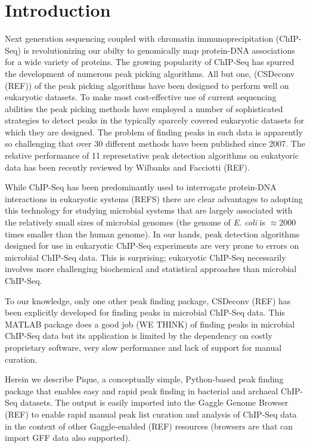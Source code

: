 \documentclass{bioinfo}
\begin{document}
\section{Introduction}

\noindent Next generation sequencing coupled with chromatin
immunoprecipitation (ChIP-Seq) is revolutionizing our abilty to
genomically map protein-DNA associations for a wide variety of
proteins.  The growing popularity of ChIP-Seq has spurred the
development of numerous peak picking algorithms.  All but one,
(CSDeconv (REF)) of the peak picking algorithms have been designed to
perform well on eukaryotic datasets.  To make most cost-effective use
of current sequencing abilities the peak picking methods have employed
a number of sophisticated strategies to detect peaks in the typically
sparcely covered eukaryotic datasets for which they are designed.  The
problem of finding peaks in such data is apparently so challenging
that over 30 different methods have been published since 2007.  The
relative performance of 11 represetative peak detection algorithms on
eukatyoric data has been recently reviewed by Wilbanks and Facciotti
(REF).

While ChIP-Seq has been predominantly used to interrogate protein-DNA
interactions in eukaryotic systems (REFS) there are clear advantages
to adopting this technology for studying microbial systems that are
largely associated with the relatively small sizes of microbial
genomes (the genome of {\em E. coli} is $\approx$2000 times smaller
than the human genome). In our hands, peak detection algorithms
designed for use in eukaryotic ChIP-Seq experiments are very prone to
errors on microbial ChIP-Seq data. This is surprising; eukaryotic
ChIP-Seq necessarily involves more challenging biochemical and
statistical approaches than microbial ChIP-Seq.

To our knowledge, only one other peak finding package, CSDeconv (REF)
has been explicitly developed for finding peaks in microbial ChIP-Seq
data. This MATLAB package does a good job (WE THINK) of finding peaks
in microbial ChIP-Seq data but its application is limited by the
dependency on costly proprietary software, very slow performance and
lack of support for manual curation.

Herein we describe Pique, a conceptually simple, Python-based peak
finding package that enables easy and rapid peak finding in bacterial
and archaeal ChIP-Seq datasets.  The output is easily imported into
the Gaggle Genome Browser (REF) to enable rapid manual peak list
curation and analysis of ChIP-Seq data in the context of other
Gaggle-enabled (REF) resources (browsers are that can import GFF data
also supported).
\end{document}
